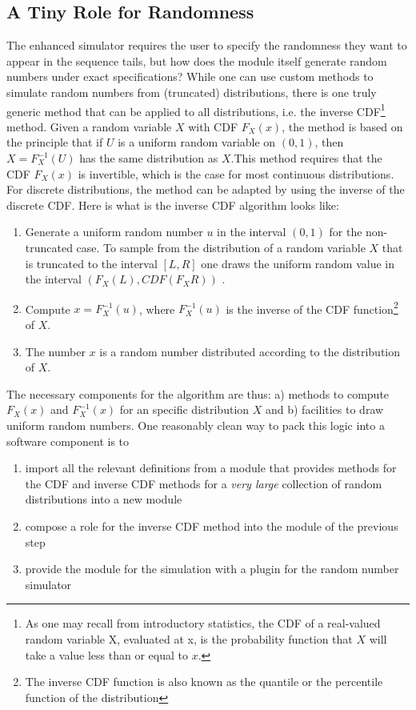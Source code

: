 \documentclass[10pt]{article}
\begin{document}
\subsection{A Tiny Role for Randomness}
The enhanced simulator requires the user to specify the randomness they want to appear in the sequence tails, but how does the module itself generate random numbers under exact specifications? While one can use custom methods to simulate random numbers from (truncated) distributions, there is one truly generic method that can be applied to all distributions, i.e. the inverse CDF\footnote{As one may recall from introductory statistics, the CDF of a real-valued random variable X, evaluated at x, is the probability function that $X$ will take a value less than or equal to $x$.} method. Given a random variable $X$ with CDF $F_X(x)$, the method is based on the principle that if $U$ is a uniform random variable on $(0,1)$, then $X = F^{-1}_X(U)$ has the same distribution as $X$.This method requires that the CDF $F_X(x)$ is invertible, which is the case for most continuous distributions. For discrete distributions, the method can be adapted by using the inverse of the discrete CDF. Here is what is the inverse CDF algorithm looks like: 

\begin{enumerate}
\item Generate a uniform random number $u$ in the interval $(0,1)$ for the non-truncated case. To sample from the distribution of a random variable $X$ that is truncated to the interval $[L,R]$ one draws the uniform random value in the interval $(F_X(L),CDF(F_XR))$ .
\item Compute $x = F^{-1}_X(u)$, where $F^{-1}_X(u)$ is the inverse of the CDF function\footnote{The inverse CDF function is also known as the quantile or the percentile function of the distribution} of $X$.
\item The number $x$ is a random number distributed according to the distribution of $X$.
\end{enumerate}

The necessary components for the algorithm are thus: a) methods to compute $F_X(x)$ and $F^{-1}_X(x)$ for an specific distribution $X$ and b) facilities to draw uniform random numbers. One reasonably clean way to pack this logic into a software component is to 
\begin{enumerate}
\item import all the relevant definitions from a module that provides methods for the CDF and inverse CDF methods for a \textit{very large} collection of random distributions into a new module
\item compose a role for the inverse CDF method into the module of the previous step
\item provide the module for the simulation with a plugin for the random number simulator
\end{enumerate}
\end{document}
